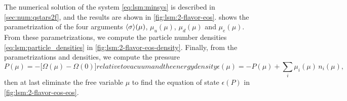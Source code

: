 The numerical solution of the system \eqref{eq:lsm:minsys} is described in \cref{sec:num:qstars2f}, and the results are shown in \cref{fig:lsm:2-flavor-eos}.
 shows the parametrization of the four arguments $\langle \sigma \rangle(\mu)$, $\mu_u(\mu)$, $\mu_d(\mu)$ and $\mu_e(\mu)$.
From these parametrizations, we compute the particle number densities \eqref{eq:lsm:particle_densities} in \cref{fig:lsm:2-flavor-eos-density}.
Finally, from the parametrizations and densities, we compute the pressure
\begin{subequations}
\begin{equation}
	P(\mu) = -\Big[\Omega(\mu) - \Omega(0)\Big]
\label{eq:lsm:pressure_bagless}
\end{equation}
relative to vacuum and the energy density
\begin{equation}
	\epsilon(\mu) = -P(\mu) + \sum_i \mu_i(\mu) \, n_i(\mu) ,
\label{eq:lsm:energy_density_bagless}
\end{equation}%
\label{eq:lsm:eos}%
\end{subequations}%
then at last eliminate the free variable $\mu$ to find the equation of state $\epsilon(P)$ in \cref{fig:lsm:2-flavor-eos-eos}.


